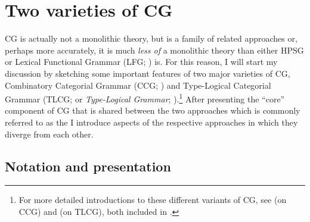 \documentclass[output=paper
                ,modfonts
 	        ,biblatex
                ,babelshorthands
                ,newtxmath
                ,draftmode
                ,colorlinks, citecolor=brown
]{langscibook}
\begin{document}


\section{Two varieties of CG \label{cgexposition}}

CG is actually not a monolithic theory, but is a family of related
approaches \emdashUS or, perhaps more accurately, it is much \emph{less of} a
monolithic theory than either HPSG or Lexical Functional Grammar (LFG;
\citealt{KB82a-u,BATW2015a}) is. For this reason, I will
start my discussion by sketching some important features of two major
varieties of CG, Combinatory Categorial Grammar (CCG;
\citealt{Steedman2000a-u,steedman2012}) and Type-Logical Categorial Grammar (TLCG; or \emph{Type-Logical Grammar};
\citealt{Morrill94a-u,Moortgat2011a-u,KubotaLevineBook}).\footnote{For 
more detailed introductions to these different variants of CG, see 
\citet{steedman2011ccg} (on CCG) and \citet{oehrle2011} (on 
TLCG), both included in \citet{BB2011a-ed}.} After presenting the ``core''
component of CG that is shared between the two approaches \emdashUS which is
commonly referred to as the  \emdashUS I introduce
aspects of the respective approaches in which they diverge from each
other.


\subsection{Notation and presentation }
\end{document}
